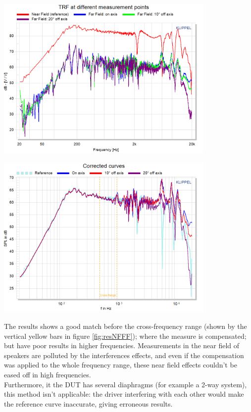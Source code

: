 \documentclass{report}
\begin{document}
\vspace{0.4cm}

\begin{minipage}{0.5\textwidth}
\begin{center}
	\includegraphics[width=0.8\textwidth]{RoomComp/NF_FF_compa} 
    \captionsetup{hypcap=false} 
	\label{fig:rawNFFF}
\end{center}
\end{minipage}
\begin{minipage}{0.5\textwidth}
\begin{center}
	\includegraphics[width=0.8\textwidth]{RoomComp/NF_FF_result} 
    \captionsetup{hypcap=false} 
	\label{fig:resNFFF}
\end{center}
\end{minipage}
\vspace{0.2cm}

The results shows a good match before the cross-frequency range (shown by the vertical yellow bars in figure \ref{fig:resNFFF}); where the measure is compensated; but have poor results in higher frequencies. Measurements in the near field of speakers are polluted by the interferences effects, and even if the compensation was applied to the whole frequency range, these near field effects couldn't be eased off in high frequencies.\\
Furthermore, it the DUT has several diaphragms (for example a 2-way system), this method isn't applicable: the driver interfering with each other would make the reference curve inaccurate, giving erroneous results. 
\end{document}
